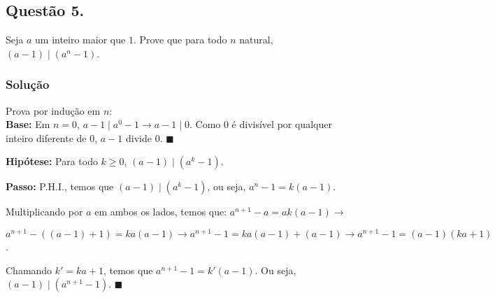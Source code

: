 \documentclass[12pt, letterpaper]{report}
\newcommand*{\CQD}{\hfill\ensuremath{\blacksquare}}%
\newcounter{ProblemNum}
\newcommand*{\anyproblem}[1]{\newpage\subsection*{#1}}
\newcommand*{\problem}[1]{\stepcounter{ProblemNum} %
   \anyproblem{Questão #1}}
\newcommand*{\soln}[1]{\subsubsection*{#1}}
\newcommand*{\solution}{\soln{Solução}}
\begin{document}
\problem{5.}
  Seja $ a $ um inteiro maior que $ 1 $. Prove que para todo $ n $ natural, $ (a - 1) \mid (a^n - 1) $.

\solution
    Prova por indução em $n$: \\

    \textbf{Base:} Em $n = 0$, $a - 1 \mid a^0 - 1 \rightarrow a - 1 \mid 0$. Como 0 é divisível por qualquer inteiro diferente de $0$, $a - 1$ divide $0$. \CQD

    \textbf{Hipótese:} Para todo $k \geq 0$, $(a - 1) \mid (a^k - 1)$.

    \textbf{Passo:} P.H.I., temos que $(a - 1) \mid (a^k - 1)$, ou seja, $a^n - 1 = k(a - 1)$.

    Multiplicando por $a$ em ambos os lados, temos que: $a^{n + 1} - a = ak(a - 1) \rightarrow$
    
    $a^{n + 1} - ((a - 1) + 1) = ka(a - 1) \rightarrow a^{n + 1} - 1 = ka(a - 1) + (a - 1) \rightarrow a^{n + 1} - 1 = (a - 1)(ka + 1)$. 

    Chamando $k' = ka + 1$, temos que $a^{n + 1} - 1 = k'(a - 1)$. Ou seja, $(a - 1) \mid (a^{n + 1} - 1)$. \CQD
\end{document}
